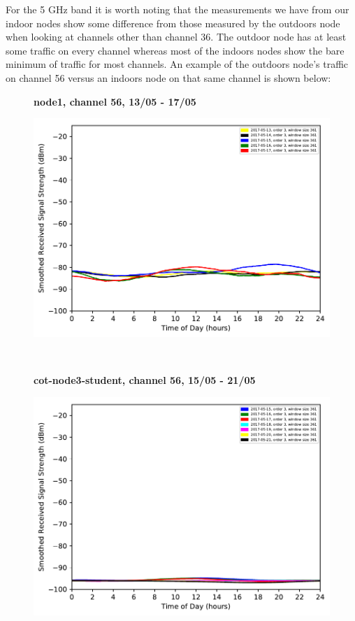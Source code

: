 For the 5 GHz band it is worth noting that the measurements we have from our indoor nodes show some difference from those measured by the outdoors node when looking at channels other than channel 36. The outdoor node has at least some traffic on every channel whereas most of the indoors nodes show the bare minimum of traffic for most channels. An example of the outdoors node's traffic on channel 56 versus an indoors node on that same channel is shown below:
\begin{figure}[h!]
    \centering
    \textbf{node1, channel 56, 13/05 - 17/05}\par\medskip
	\includegraphics[scale=0.5]{images/5_GHz/node1_2017-05-17_chan56_image.pdf}
\end{figure}\\
\begin{figure}[h!]
    \centering
    \textbf{cot-node3-student, channel 56, 15/05 - 21/05}\par\medskip
	\includegraphics[scale=0.5]{images/5_GHz/cot-node9-student_2017-05-21_chan56_image.pdf}
\end{figure}\\
